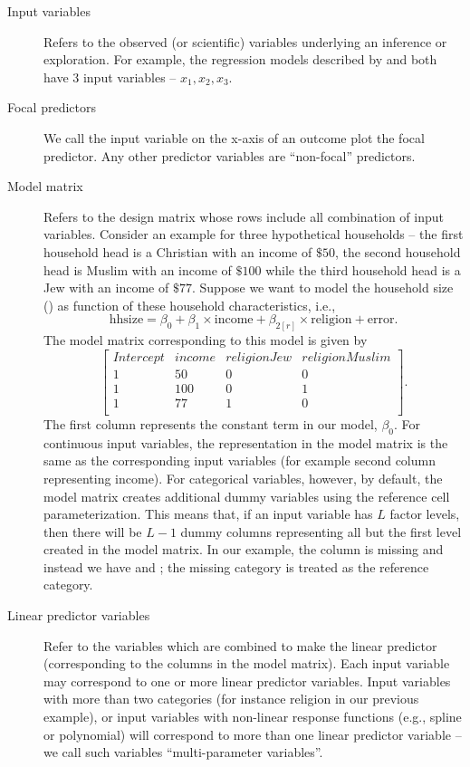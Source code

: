 \begin{description}
\item [Input variables] Refers to the observed (or scientific) variables underlying an inference or exploration. For example, the regression models described by  and  both have $3$ input variables -- $x_1, x_2, x_3$.
\item [Focal predictors] We call the input variable on the x-axis of an outcome plot the focal predictor.  Any other predictor variables are ``non-focal'' predictors. 

\item [Model matrix] Refers to the design matrix whose rows include all combination of input variables. Consider an example for three hypothetical households -- the first household head is a Christian with an income of $\$ 50$, the second household head is Muslim with an income of $\$ 100$ while the third household head is a Jew with an income of $\$ 77$. Suppose we want to model the household size () as function of these household characteristics, i.e., $$\mathrm{hhsize} = \beta_0 + \beta_1\times\mathrm{income} + \beta_{2[r]}\times\mathrm{religion} + \mathrm{error}.$$ The model matrix corresponding to this model is given by
$$\begin{bmatrix}{}
 Intercept & income & religionJew & religionMuslim \\
 1 & 50 & 0 & 0 \\
  1 & 100 & 0 & 1 \\
  1 & 77 & 1 & 0 \\
\end{bmatrix}.$$ The first column represents the constant term in our model, $\beta_0$. For continuous input variables, the representation in the model matrix is the same as the corresponding input variables (for example second column representing income). For categorical variables, however, by default, the model matrix  creates additional dummy variables using the reference cell parameterization. This means that, if an input variable has $L$ factor levels, then there will be $L-1$ dummy columns representing all but the first level created in the model matrix. In our example, the column  is missing and instead we have  and ; the missing category  is treated as the reference category.

\item [Linear predictor variables] Refer to the variables which are combined to make the linear predictor (corresponding to the columns in the model matrix). Each input variable may correspond to one or more linear predictor variables. Input variables with more than two categories (for instance religion in our previous example), or input variables with non-linear response functions (e.g., spline or polynomial) will correspond to more than one linear predictor variable -- we call such variables “multi-parameter variables”.


\end{description}
